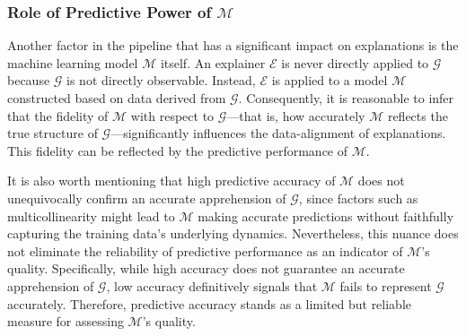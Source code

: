 \documentclass[12pt]{article}  %
\newcommand{\mM}{\mathcal{M}}
\newcommand{\tw}[1]{\textcolor{red}{Tong: #1}}
\newtheorem{corollary}[theorem]{Corollary}
\begin{document}
            

    \subsubsection{Role of Predictive Power of $\mathcal{M}$}
        \label{sec:role_of_predictive_power}
           Another factor in the pipeline that has a significant impact on  explanations is the machine learning model $\mathcal{M}$ itself. 
      An explainer $\mathcal{E}$ is never directly applied to $\mathcal{G}$ because  $\mathcal{G}$ is not directly observable. Instead, $\mathcal{E}$ is applied to a model $\mathcal{M}$ constructed based on data derived from $\mathcal{G}$. Consequently, it is reasonable to infer that the fidelity of $\mathcal{M}$ with respect to $\mathcal{G}$—that is, how accurately $\mathcal{M}$ reflects the true structure of $\mathcal{G}$—significantly influences the data-alignment of explanations. This fidelity can be reflected by the predictive performance of $\mM$.  

           It is also worth mentioning that high predictive accuracy of $\mathcal{M}$ does not unequivocally confirm an accurate apprehension of $\mathcal{G}$, since factors such as multicollinearity might lead to $\mathcal{M}$ making accurate predictions without faithfully capturing the training data's underlying dynamics. Nevertheless, this nuance does not eliminate the reliability of predictive performance as an indicator of $\mathcal{M}$'s quality. Specifically, while high accuracy does not guarantee an accurate apprehension of $\mathcal{G}$, low accuracy definitively signals that $\mathcal{M}$ fails to represent $\mathcal{G}$ accurately. Therefore, predictive accuracy stands as a limited but reliable measure for assessing $\mathcal{M}$'s quality.
 
\end{document}
